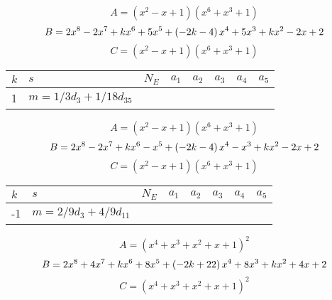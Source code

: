 \documentclass{amsart}
\begin{document}
$$A=(x^2
 - x
 + 1)(x^6
 + x^3
 + 1)$$
$$B=2\*x^8
 - 2\*x^7
 + k\*x^6
 + 5\*x^5
 + \left(-2\*k
 - 4\right) \*x^4
 + 5\*x^3
 + k\*x^2
 - 2\*x
 + 2$$
$$C=(x^2
 - x
 + 1)(x^6
 + x^3
 + 1)$$
\begin{longtable}{|l|l|l|lllll|}
\hline
$k$ & $s$ & $N_E$ & $a_1$ & $a_2$ & $a_3$ & $a_4$ & $a_5$\\
\hline
1&$m=1/3d_{3}+1/18d_{35}$&&\multicolumn{5}{c|}{}\\
\hline
\end{longtable}
$$A=(x^2
 - x
 + 1)(x^6
 + x^3
 + 1)$$
$$B=2\*x^8
 - 2\*x^7
 + k\*x^6
 - x^5
 + \left(-2\*k
 - 4\right) \*x^4
 - x^3
 + k\*x^2
 - 2\*x
 + 2$$
$$C=(x^2
 - x
 + 1)(x^6
 + x^3
 + 1)$$
\begin{longtable}{|l|l|l|lllll|}
\hline
$k$ & $s$ & $N_E$ & $a_1$ & $a_2$ & $a_3$ & $a_4$ & $a_5$\\
\hline
-1&$m=2/9d_{3}+4/9d_{11}$&&\multicolumn{5}{c|}{}\\
\hline
\end{longtable}
$$A=(x^4
 + x^3
 + x^2
 + x
 + 1)^{2}$$
$$B=2\*x^8
 + 4\*x^7
 + k\*x^6
 + 8\*x^5
 + \left(-2\*k
 + 22\right) \*x^4
 + 8\*x^3
 + k\*x^2
 + 4\*x
 + 2$$
$$C=(x^4
 + x^3
 + x^2
 + x
 + 1)^{2}$$
\end{document}
